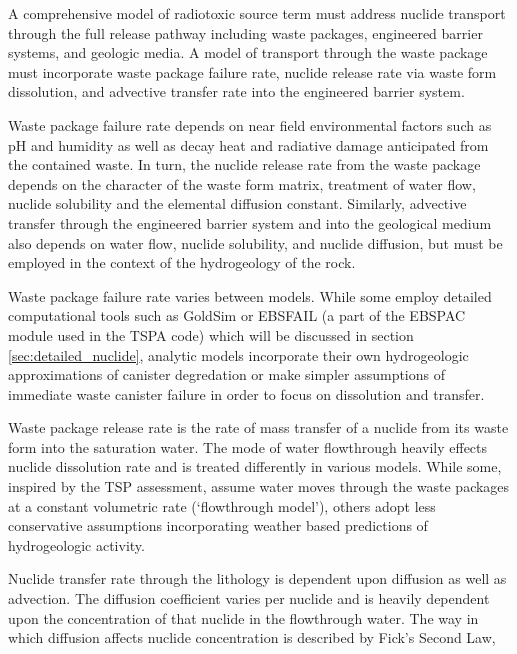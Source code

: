 


A comprehensive model of radiotoxic source term must address nuclide transport
through the full release pathway including waste packages, engineered barrier
systems, and geologic media. A model of transport through the waste package
must incorporate waste package failure rate, nuclide release rate via waste
form dissolution, and advective transfer rate into the engineered barrier
system.  

Waste package failure rate depends on near field environmental factors such as
pH and humidity as well as decay heat and radiative damage anticipated from the
contained waste.  In turn, the nuclide release rate from the waste package
depends on the character of the waste form matrix, treatment of water flow,
nuclide solubility and the elemental diffusion constant.  Similarly, advective
transfer through the engineered barrier system and into the geological medium
also depends on water flow, nuclide solubility, and nuclide diffusion, but must
be employed in the context of the hydrogeology of the rock.   

Waste package failure rate varies between models. While some employ detailed 
computational tools such as GoldSim or EBSFAIL (a part of the EBSPAC module 
used in the TSPA code) which will be discussed in section 
\ref{sec:detailed_nuclide}, 
analytic models incorporate their own hydrogeologic approximations of
canister degredation or make simpler assumptions of immediate waste canister 
failure in order to focus on dissolution and transfer. 

Waste package release rate is the rate of mass transfer of a nuclide from its
waste form into the saturation water. The mode of water flowthrough heavily
effects nuclide dissolution rate and is treated differently in various models.
While some, inspired by the TSP assessment, assume water moves through the
waste packages at a constant volumetric rate (`flowthrough model'), others
adopt less conservative assumptions incorporating weather based predictions of
hydrogeologic activity.

Nuclide transfer rate through the lithology is  dependent upon diffusion as
well as advection.  The diffusion coefficient varies per nuclide and is heavily
dependent upon the concentration of that nuclide in the flowthrough water.
The way in which diffusion affects nuclide concentration is described by Fick's 
Second Law, 

